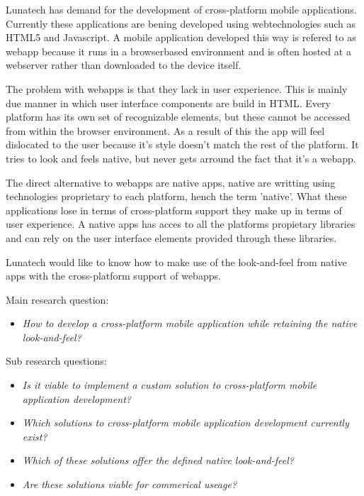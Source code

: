 

Lunatech has demand for the development of cross-platform mobile applications. Currently these applications are bening developed using webtechnologies such as HTML5 and Javascript. A mobile application developed this way is refered to as webapp because it runs in a browserbased environment and is often hosted at a webserver rather than downloaded to the device itself.

The problem with webapps is that they lack in user experience. This is mainly due manner in which user interface components are build in HTML. Every platform has its own set of recognizable elements, but these cannot be accessed from within the browser environment. As a result of this the app will feel dislocated to the user because it's style doesn't match the rest of the platform. It tries to look and feels native, but never gets arround the fact that it's a webapp.

The direct alternative to webapps are native apps, native are writting using technologies proprietary to each platform, hench the term 'native'. What these applications lose in terms of cross-platform support they make up in terms of user experience.  A native apps has acces to all the platforms propietary libraries and can rely on the user interface elements provided through these libraries.

Lunatech would like to know how to make use of the look-and-feel from native apps with the cross-platform support of webapps.


Main research question:
\begin{itemize}
\item \emph{How to develop a cross-platform mobile application while retaining the native look-and-feel?}
\end{itemize}

\noindent Sub research questions:
\begin{itemize}
\item \emph{Is it viable to implement a custom solution to cross-platform mobile application development?}
\item \emph{Which solutions to cross-platform mobile application development currently exist?}
\item \emph{Which of these solutions offer the defined native look-and-feel?}
\item \emph{Are these solutions viable for commerical useage?}
\end{itemize}

